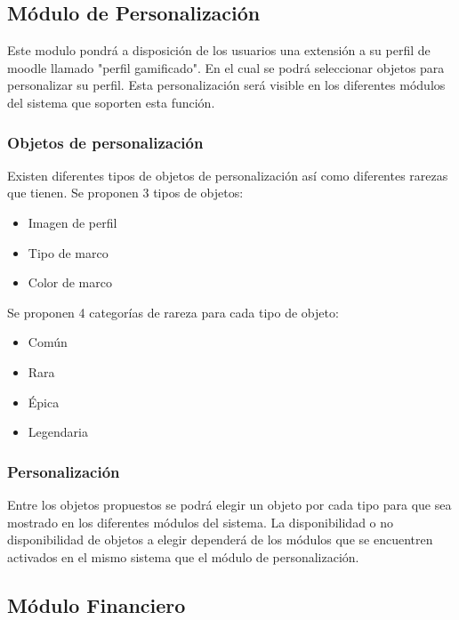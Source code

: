 \subsection{Módulo de Personalización}

Este modulo pondrá a disposición de los usuarios una extensión a su perfil de moodle llamado "perfil gamificado". En el cual se podrá
seleccionar objetos para personalizar su perfil. Esta personalización será visible en los diferentes módulos del sistema que soporten
esta función.

\subsubsection{Objetos de personalización}

Existen diferentes tipos de objetos de personalización así como diferentes rarezas que tienen. Se proponen 3 tipos de objetos:

\begin{itemize}
  \item Imagen de perfil
  \item Tipo de marco
  \item Color de marco
\end{itemize}

Se proponen 4 categorías de rareza para cada tipo de objeto:

\begin{itemize}
  \item Común
  \item Rara
  \item Épica
  \item Legendaria
\end{itemize}

\subsubsection{Personalización}

Entre los objetos propuestos se podrá elegir un objeto por cada tipo para que sea mostrado en los diferentes módulos del sistema. La disponibilidad
o no disponibilidad de objetos a elegir dependerá de los módulos que se encuentren activados en el mismo sistema que el módulo de personalización.


\subsection{Módulo Financiero}

